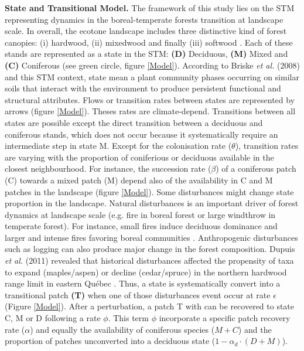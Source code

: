 \textbf{State and Transitional Model.} The framework of this study lies on the
STM representing dynamics in the boreal-temperate forests transition at
landscape scale.  In overall, the ecotone landscape includes three distinctive
kind of forest canopies: (i) hardwood, (ii) mixedwood and finally (iii)
softwood \cite{Fisichelli2013}. Each of these stands are represented as a
state in the STM: \textbf{(D)} Deciduous, \textbf{(M)} Mixed and \textbf{(C)}
Coniferous (see green circle, figure \ref{Model}). According to Briske\textit{
et al.} (2008) and this STM context, state mean a plant community phases
occurring on similar soils that interact with the environment to produce
persistent functional and structural attributes. Flows or transition rates
between states are represented by arrows (figure \ref{Model}). Theses rates
are climate-depend. Transitions between all states are possible  except the
direct transition between a deciduous and coniferous stands, which does not
occur because it systematically require an intermediate step in state M.
Except for the colonisation rate ($\theta$), transition rates are varying with
the proportion of coniferious or deciduous available in the closest
neighbourhood. For instance, the succession rate ($\beta$) of a coniferous
patch (C) towards a mixed patch (M) depend also of the availability in C and M
patches in the landscape (figure \ref{Model}). Some disturbances might change
state proportion in the landscape. Natural disturbances is an important driver
of forest dynamics at landscape scale (e.g. fire in boreal forest or large
windthrow in temperate forest). For instance, small fires induce deciduous
dominance and larger and intense fires favoring boreal communities
\cite{Bergeron2004}. Anthropogenic disturbances such as logging can also
produce major change in the forest composition. Dupuis \textit{et al.} (2011)
revealed that historical disturbances affected the propensity of taxa to
expand (maples/aspen) or decline (cedar/spruce) in the northern hardwood range
limit in eastern Québec \cite{Dupuis2011}. Thus, a state is systematically
convert into a transitional patch \textbf{(T)} when one of those disturbances
event occur at rate $\epsilon$ (Figure \ref{Model}). After a perturbation, a
patch T with can be recovered to state C, M or D following a rate $\phi$. This
term $\phi$ incorporate a specific patch recovery rate ($\alpha$) and equally
the availability of coniferous species ($M+C$) and the proportion of patches
unconverted into a deciduous state ($1- \alpha_d \cdot (D + M)$).

